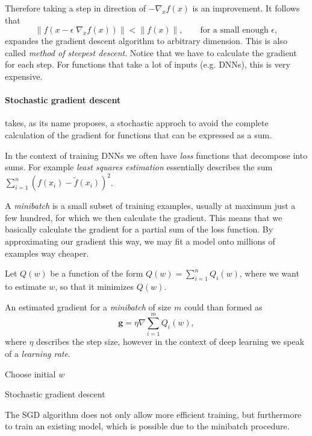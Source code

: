 Therefore taking a step in direction of \(-\nabla_x f(x)\) is an improvement.
It follows that
\begin{equation}
    \lVert f(x - \epsilon \; \nabla_x f(x)) \rVert < \lVert f(x) \rVert, \qquad \text{for a small enough } \epsilon,
\end{equation}
expandes the gradient descent algorithm to arbitrary dimension. This is also called \emph{method of steepest descent}.
Notice that we have to calculate the gradient for each step.
For functions that take a lot of inputs (e.g. DNNs), this is very expensive.

\paragraph{Stochastic gradient descent} takes, as its name proposes, a stochastic approch to avoid the complete calculation of the gradient for functions that can be expressed as a sum.

In the context of training DNNs we often have \emph{loss} functions that decompose into sums.
For example \emph{least squares estimation} essentially describes the sum \(\sum^{n}_{i = 1} (f(x_i) - \tilde{f}(x_i))^2\).

A \emph{minibatch} is a small subset of training examples, usually at maximum just a few hundred, for which we then calculate the gradient.
This means that we basically calculate the gradient for a partial sum of the loss function.
By approximating our gradient this way, we may fit a model onto millions of examples way cheaper. 

Let \(Q(w)\) be a function of the form \(Q(w) = \sum^{n}_{i = 1} Q_i(w)\), where we want to estimate \(w\), so that it minimizes \(Q(w)\).

An estimated gradient for a \emph{minibatch} of size \(m\) could than formed as
\begin{equation}
    \boldsymbol{g} = \eta \nabla \sum^{m}_{i = 1} Q_i(w),
\end{equation}
where \(\eta\) describes the step size, however in the context of deep learning we speak of a \emph{learning rate}.

\begin{algorithm}[H]
    \BlankLine
    Choose initial $w$\;
    \caption{Stochastic gradient descent}
\end{algorithm}
The SGD algorithm does not only allow more efficient training, but furthermore to train an existing model, which is possible due to the minibatch procedure.


